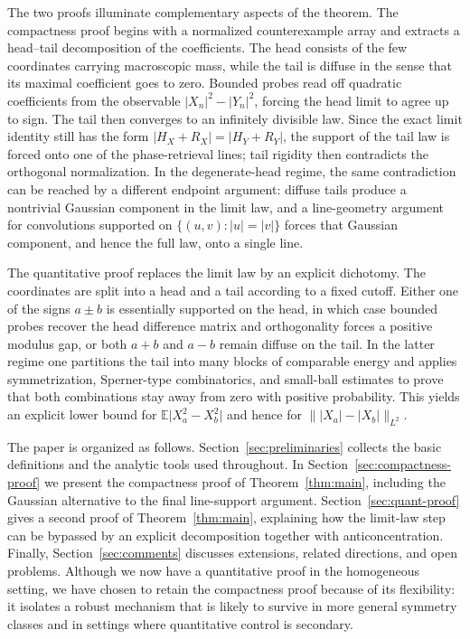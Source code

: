 \documentclass[11pt]{amsart}
\numberwithin{equation}{section}
\theoremstyle{definition}
\theoremstyle{remark}
\newcommand{\E}{\mathbb E}
\newcommand{\abs}[1]{\lvert #1 \rvert}
\newcommand{\norm}[1]{\lVert #1 \rVert}
\begin{document}
The two proofs illuminate complementary aspects of the theorem.  The
compactness proof begins with a normalized counterexample array and extracts a
head--tail decomposition of the coefficients.  The head consists of the few
coordinates carrying macroscopic mass, while the tail is diffuse in the sense
that its maximal coefficient goes to zero.  Bounded probes read off quadratic
coefficients from the observable $|X_n|^2-|Y_n|^2$, forcing the head limit to
agree up to sign.  The tail then converges to an infinitely divisible law.
Since the exact limit identity still has the form
$|H_X+R_X|=|H_Y+R_Y|$, the support of the tail law is forced onto one of the
phase-retrieval lines; tail rigidity then contradicts the orthogonal
normalization.  In the degenerate-head regime, the same contradiction can be
reached by a different endpoint argument: diffuse tails produce a nontrivial
Gaussian component in the limit law, and a line-geometry argument for
convolutions supported on $\{(u,v):\abs{u}=\abs{v}\}$ forces that Gaussian
component, and hence the full law, onto a single line.

The quantitative proof replaces the limit law by an explicit dichotomy.  The
coordinates are split into a head and a tail according to a fixed cutoff.
Either one of the signs $a\pm b$ is essentially supported on the head, in
which case bounded probes recover the head difference matrix and orthogonality
forces a positive modulus gap, or both $a+b$ and $a-b$ remain diffuse on the
tail.  In the latter regime one partitions the tail into many blocks of
comparable energy and applies symmetrization, Sperner-type combinatorics, and
small-ball estimates to prove that both combinations stay away from zero with
positive probability.  This yields an explicit lower bound for
$\E\abs{X_a^2-X_b^2}$ and hence for $\norm{\abs{X_a}-\abs{X_b}}_{L^2}$.

The paper is organized as follows.  Section~\ref{sec:preliminaries} collects
the basic definitions and the analytic tools used throughout.  In
Section~\ref{sec:compactness-proof} we present the compactness proof of
Theorem~\ref{thm:main}, including the Gaussian alternative to the final
line-support argument.  Section~\ref{sec:quant-proof} gives a second proof of
Theorem~\ref{thm:main}, explaining how the limit-law step can be bypassed by an
explicit decomposition together with anticoncentration.
Finally, Section~\ref{sec:comments} discusses extensions, related directions,
and open problems.  Although we now have a quantitative proof in the
homogeneous setting, we have chosen to retain the compactness proof because of
its flexibility: it isolates a robust mechanism that is likely to survive in
more general symmetry classes and in settings where quantitative control is
secondary.
\end{document}
